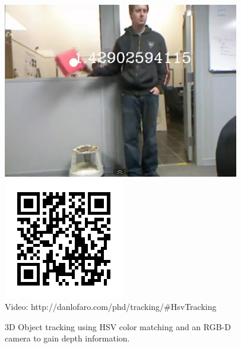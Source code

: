 \begin{figure}[thpb]
  \centering
      \includegraphics[width=0.69\columnwidth]{./examples/pix/hsv.png}
      \includegraphics[width=0.3\columnwidth]{./qrcode/qrcode-hsvtrackingexample.png}\\
      Video: http://danlofaro.com/phd/tracking/\#HsvTracking
\caption{3D Object tracking using HSV color matching and an RGB-D camera to gain depth information.}
\label{fig:visualservoing}
\end{figure}
